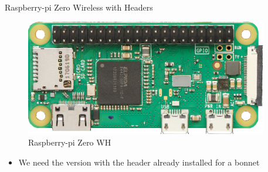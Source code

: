 \begin{frame}
   {Raspberry-pi Zero Wireless with Headers}
   \begin{figure}[H]
      \includegraphics[height=2in]{IMAGES/rpi0wh}
      \caption{Raspberry-pi Zero WH}
   \end{figure}
   \begin{itemize}
      \item We need the version with the header already installed for a bonnet
   \end{itemize}
\end{frame}

\cprotect{}

